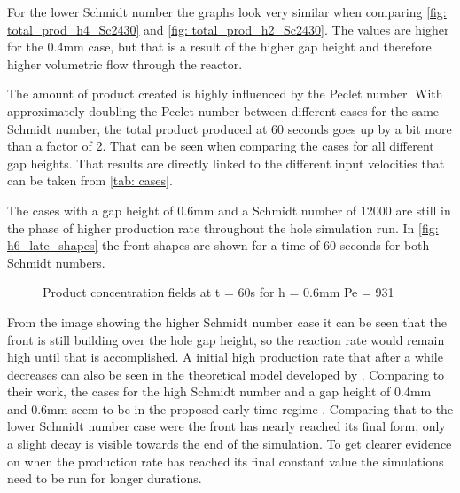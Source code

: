 \documentclass[../thesis.tex]{subfiles}
\begin{document}
For the lower Schmidt number the graphs look very similar when comparing \autoref{fig: total_prod_h4_Sc2430} and \autoref{fig: total_prod_h2_Sc2430}. The values are higher for the 0.4mm case, but that is a result of the higher gap height and therefore higher volumetric flow through the reactor.

The amount of product created is highly influenced by the Peclet number. With approximately doubling the Peclet number between different cases for the same Schmidt number, the total product produced at 60 seconds goes up by a bit more than a factor of 2. That can be seen when comparing the cases for all different gap heights. That results are directly linked to the different input velocities that can be taken from \autoref{tab: cases}.

The cases with a gap height of 0.6mm and a Schmidt number of 12000 are still in the phase of higher production rate throughout the hole simulation run. In \autoref{fig: h6_late_shapes} the front shapes are shown for a time of 60 seconds for both Schmidt numbers.
\begin{figure}[htb]
	\centering
	\qquad
	\caption{Product concentration fields at t = 60s for  h = 0.6mm  Pe = 931}%
	\label{fig: h6_late_shapes}%
\end{figure}
From the image showing the higher Schmidt number case it can be seen that the front is still building over the hole gap height, so the reaction rate would remain high until that is accomplished. A initial high production rate that after a while decreases can also be seen in the theoretical model developed by \cite{comolli2021dynamics}. Comparing to their work, the cases for the high Schmidt number and a gap height of 0.4mm and 0.6mm seem to be in the proposed early time regime \cite{comolli2021dynamics}.
Comparing that to the lower Schmidt number case were the front has nearly reached its final form, only a slight decay is visible towards the end of the simulation. To get clearer evidence on when the production rate has reached its final constant value the simulations need to be run for longer durations.
\end{document}
